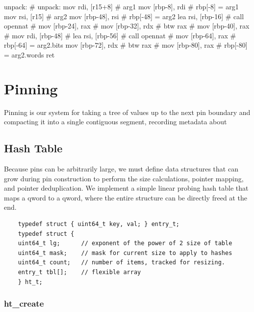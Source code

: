 \begin{asm}
unpack:                                     # unpack:
	mov	rdi, [r15+8]                #   arg1
	mov	[rbp-8], rdi                #   rbp[-8] = arg1
	mov	rsi, [r15]                  #   arg2
	mov	[rbp-48], rsi               #   rbp[-48] = arg2
	lea	rsi, [rbp-16]               #
	call	opennat                     #
	mov	[rbp-24], rax               #
	mov	[rbp-32], rdx               #
	btw	rax                         #
	mov	[rbp-40], rax               #
	mov	rdi, [rbp-48]               #
	lea	rsi, [rbp-56]               #
	call	opennat                     #
	mov	[rbp-64], rax               #   rbp[-64] = arg2.bits
	mov	[rbp-72], rdx               #
	btw	rax                         #
	mov	[rbp-80], rax               #   rbp[-80] = arg2.words
	ret
\end{asm}

\section{Pinning}

Pinning is our system for taking a tree of values up to the next pin boundary
and compacting it into a single contiguous segment, recording metadata about

\subsection{Hash Table}

Because pins can be arbitrarily large, we must define data structures that can
grow during pin construction to perform the size calculations, pointer mapping,
and pointer deduplication. We implement a simple linear probing hash table that
maps a qword to a qword, where the entire structure can be directly freed at
the end.

\begin{verbatim}
    typedef struct { uint64_t key, val; } entry_t;
    typedef struct {
   	uint64_t lg;      // exponent of the power of 2 size of table
   	uint64_t mask;    // mask for current size to apply to hashes
   	uint64_t count;   // number of items, tracked for resizing.
   	entry_t tbl[];    // flexible array
    } ht_t;
\end{verbatim}

\subsubsection{ht\_create}

